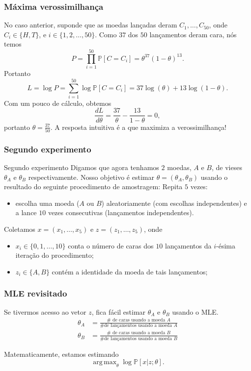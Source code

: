 \documentclass{beamer}
\newcommand{\Prob}{\mathbb{P}}
\DeclareMathOperator*{\argmax}{arg\,max}
\begin{document}
\begin{frame}

	\frametitle{Máxima verossimilhança}
	No caso anterior, suponde que as moedas lançadas deram $C_1,\ldots,C_{50}$,
	onde $C_i \in \{H, T\}$, e $i\in \{1,2,\ldots, 50\}$. \pause
	Como $37$ dos $50$ lançamentos deram cara, nós temos
	\[
	  P = \prod_{i=1}^{50} \Prob[C = C_i] = \theta^{37}(1-\theta)^{13}.
	\]
	\pause
	Portanto
	\[
	  L = \log P = \sum_{i=1}^{50} \log \Prob[C=C_i] = 37 \log(\theta)
	  +13 \log(1-\theta).
	\]
	\pause
	Com um pouco de cálculo, obtemos
	\[
	\frac{d L}{d \theta} = \frac{37}{\theta} - \frac{13}{1-\theta} = 0,
	\]
	\pause
	portanto $\theta = \frac{37}{50}$. \pause
	A resposta intuitiva é a que maximiza a verossimilhança!

\end{frame}

\begin{frame}

	\frametitle{Segundo experimento}
	\begin{block}{Segundo experimento}
	Digamos que agora tenhamos $2$ moedas, $A$ e $B$, de vieses $\theta_A$
	e $\theta_B$ respectivamente. Nosso objetivo é estimar $\theta=(\theta_A,
	\theta_B)$ usando o resultado do seguinte procedimento de amostragem:
	\pause
	\medskip
	Repita $5$ vezes:
	\begin{itemize}
		\item escolha uma moeda ($A$ ou $B$) aleatoriamente (com escolhas
		independentes) e a lance $10$ vezes consecutivas (lançamentos
		independentes).
	\end{itemize}
	\end{block}
	\pause
	Coletamos $x=(x_1,\ldots, x_5)$ e $z=(z_1,\ldots, z_5)$, onde
	\begin{itemize}
		\item $x_i\in \{0,1,\ldots, 10\}$ conta o número de caras
		dos $10$ lançamentos da $i$-ésima iteração do procedimento;
		\pause
		\item $z_i\in \{A,B\}$ contém a identidade da moeda de tais
		lançamentos;
	\end{itemize}

\end{frame}

\begin{frame}

	\frametitle{MLE revisitado}
	Se tivermos acesso ao vetor $z$, fica fácil estimar $\theta_A$ e $\theta_B$
	usando o MLE.
	\pause
	\begin{align*}
	  \theta_A &= \frac{\# \text{ de caras usando a moeda } A}{
	  	                \# \text{de lançamentos usando a moeda } A} \\
	  \theta_B &= \frac{\# \text{ de caras usando a moeda } B}{
	  	\# \text{de lançamentos usando a moeda } B}
	\end{align*}
	\pause

	\bigskip
	Matematicamente, estamos estimando
	\[
	  \argmax_{\theta} \log \Prob[x|z; \theta].
	\]

\end{frame}
\end{document}
